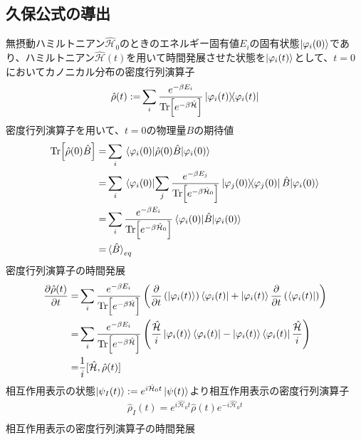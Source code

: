 \documentclass{ltjsarticle}
\begin{document}
\subsection{久保公式の導出}
無摂動ハミルトニアン$\hat{\mathcal{H}}_0$のときのエネルギー固有値$E_i$の固有状態$\ket{\varphi_i(0)}$であり、ハミルトニアン$\hat{\mathcal{H}}(t)$を用いて時間発展させた状態を$\ket{\varphi_i(t)}$として、$t=0$においてカノニカル分布の密度行列演算子
\begin{align}
  \hat{\rho}(t):=&\sum_i\frac{e^{-\beta E_i}}{\Tr[e^{-\beta\hat{\mathcal{H}}}]}\ketbra{\varphi_i(t)}\\
\end{align}
密度行列演算子を用いて、$t=0$の物理量$B$の期待値
\begin{align}
  \Tr[\hat{\rho}(0)\hat{B}]=&\sum_i \ev{\hat{\rho}(0)\hat{B}}{\varphi_i(0)}\\
  =&\sum_i \ev{\sum_j\frac{e^{-\beta E_j}}{\Tr[e^{-\beta\hat{\mathcal{H}}_0}]}\ketbra{\varphi_j(0)}\hat{B}}{\varphi_i(0)}\\
  =&\sum_i \frac{e^{-\beta E_i}}{\Tr[e^{-\beta\hat{\mathcal{H}}_0}]}\ev{\hat{B}}{\varphi_i(0)}\\
  =&\ev*{\hat{B}}_{eq}
\end{align}
密度行列演算子の時間発展
\begin{align}
  \pdv{\hat{\rho}(t)}{t}=&\sum_i\frac{e^{-\beta E_i}}{\Tr[e^{-\beta\hat{\mathcal{H}}}]}\left(\pdv{t}\left(\ket{\varphi_i(t)}\right)\bra{\varphi_i(t)}+\ket{\varphi_i(t)}\pdv{t}\left(\bra{\varphi_i(t)}\right)\right)\\
  =&\sum_i\frac{e^{-\beta E_i}}{\Tr[e^{-\beta\hat{\mathcal{H}}}]}\left(\frac{\hat{\mathcal{H}}}{i}\ket{\varphi_i(t)}\bra{\varphi_i(t)}-\ket{\varphi_i(t)}\bra{\varphi_i(t)}\frac{\hat{\mathcal{H}}}{i}\right)\\
  =&\frac{1}{i}[\hat{\mathcal{H}},\hat{\rho}(t)]\\
\end{align}
相互作用表示の状態$\ket{\psi_I(t)}:=e^{i\hat{\mathcal{H}}_0t}\ket{\psi(t)}$より相互作用表示の密度行列演算子
\begin{align}
  \hat{\rho}_I(t)=e^{i\hat{\mathcal{H}}_0t}\hat{\rho}(t) e^{-i\hat{\mathcal{H}}_0t}\\
\end{align}
相互作用表示の密度行列演算子の時間発展
\end{document}
